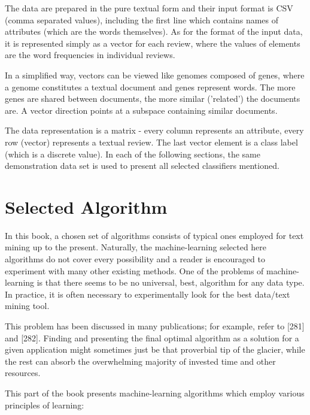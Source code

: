 \documentclass[11pt,openany,executivepaper]{book}
\begin{document}
The data are prepared in the pure textual form and their input format is CSV (comma separated values), including the first line which contains names of attributes (which are the words themselves). As for the format of the input data, it is represented simply as a vector for each review, where the values of elements are the word frequencies in individual reviews.

In a simplified way, vectors can be viewed like genomes composed of genes, where a genome constitutes a textual document and genes represent words. The more genes are shared between documents, the more similar ('related') the documents are. A vector direction points at a subspace containing similar documents.

The data representation is a matrix - every column represents an attribute, every row (vector) represents a textual review. The last vector element is a class label (which is a discrete value). In each of the following sections, the same demonstration data set is used to present all selected classifiers mentioned.

\section{Selected Algorithm}
In this book, a chosen set of algorithms consists of typical ones employed for text mining up to the present. Naturally, the machine-learning selected here algorithms do not cover every possibility and a reader is encouraged to experiment with many other existing methods. One of the problems of machine-learning is that there seems to be no universal, best, algorithm for any data type. In practice, it is often necessary to experimentally look for the best data/text mining tool.

This problem has been discussed in many publications; for example, refer to [281] and [282]. Finding and presenting the final optimal algorithm as a solution for a given application might sometimes just be that proverbial tip of the glacier, while the rest can absorb the overwhelming majority of invested time and other resources.

This part of the book presents machine-learning algorithms which employ various principles of learning:
\end{document}

